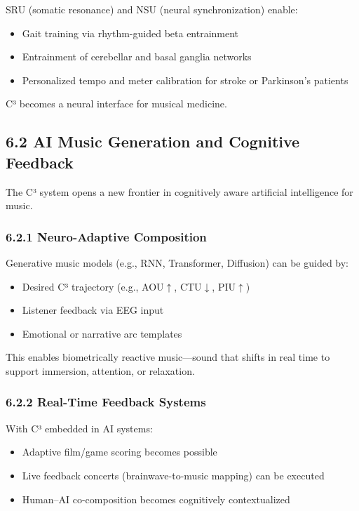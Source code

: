 \documentclass[10pt]{article}
\begin{document}
SRU (somatic resonance) and NSU (neural synchronization) enable:

\begin{itemize}
    \item Gait training via rhythm-guided beta entrainment
    \item Entrainment of cerebellar and basal ganglia networks
    \item Personalized tempo and meter calibration for stroke or Parkinson’s patients
\end{itemize}

C³ becomes a neural interface for musical medicine.

\subsection*{6.2 AI Music Generation and Cognitive Feedback}

The C³ system opens a new frontier in cognitively aware artificial intelligence for music.

\subsubsection*{6.2.1 Neuro-Adaptive Composition}

Generative music models (e.g., RNN, Transformer, Diffusion) can be guided by:

\begin{itemize}
    \item Desired C³ trajectory (e.g., AOU$\uparrow$, CTU$\downarrow$, PIU$\uparrow$)
    \item Listener feedback via EEG input
    \item Emotional or narrative arc templates
\end{itemize}

This enables biometrically reactive music—sound that shifts in real time to support immersion, attention, or relaxation.

\subsubsection*{6.2.2 Real-Time Feedback Systems}

With C³ embedded in AI systems:

\begin{itemize}
    \item Adaptive film/game scoring becomes possible
    \item Live feedback concerts (brainwave-to-music mapping) can be executed
    \item Human–AI co-composition becomes cognitively contextualized
\end{itemize}
\end{document}
